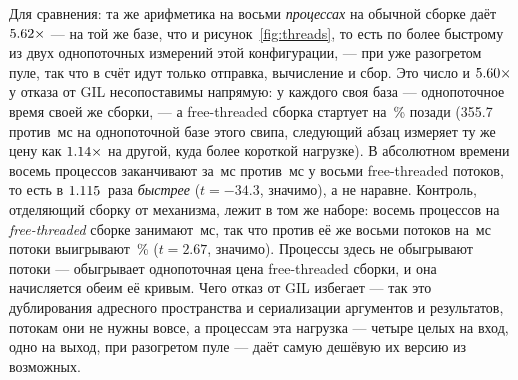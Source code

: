 Для сравнения: та же арифметика на восьми \emph{процессах} на обычной сборке даёт $\meas{ratio:b4_threads-gil:py_arith/gil/T1_control|b4_threads-gil:py_arith/gil/procs8}{5.62}\times$
--- на той же базе, что и рисунок~\ref{fig:threads}, то есть по более быстрому из двух
однопоточных измерений этой конфигурации, --- при уже разогретом пуле, так что в счёт идут только
отправка, вычисление и сбор. Это число и $\meas{ratio:b4_threads-ft:py_arith/ft/T1_control|b4_threads-ft:py_arith/ft/T8}{5.60}\times$ у отказа от GIL несопоставимы напрямую: у
каждого своя база --- однопоточное время своей же сборки, --- а free-threaded сборка стартует на
\,\% позади (355.7 против \,мс на однопоточной базе этого свипа, следующий абзац измеряет
ту же цену как $\meas{ratio:b4_threads-ft:single_thread_arith/ft|b4_threads-gil:single_thread_arith/gil}{1.14}\times$ на другой, куда более короткой нагрузке). В абсолютном времени восемь
процессов заканчивают за \,мс против \,мс у восьми free-threaded потоков, то есть в
$\meas{ratio:b4_threads-ft:py_arith/ft/T8|b4_threads-gil:py_arith/gil/procs8}{1.115}$~раза \emph{быстрее} ($t=-34.3$, значимо), а не наравне. Контроль, отделяющий сборку от механизма, лежит в том же наборе: восемь
процессов на \emph{free-threaded} сборке занимают \,мс, так что против её же восьми потоков
на \,мс потоки выигрывают \,\% ($t=2.67$, значимо). Процессы здесь не обыгрывают потоки
--- обыгрывает однопоточная цена free-threaded сборки, и она начисляется обеим её кривым.
Чего отказ от GIL избегает --- так это дублирования адресного пространства и сериализации
аргументов и результатов, потокам они не нужны вовсе, а процессам эта нагрузка --- четыре целых
на вход, одно на выход, при разогретом пуле --- даёт самую дешёвую их версию из возможных.

